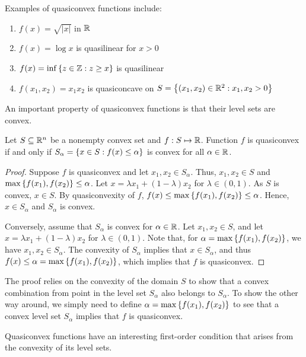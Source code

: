 Examples of quasiconvex functions include:
%
\begin{enumerate}
	\item $f(x) = \sqrt{|x|}$ in $\mathbb{R}$
	\item $f(x) = \log x$ is quasilinear for $x > 0 $ 
	\item $f(x) = \inf\left\{ z \in \mathbb{Z} : z \geq x \right \}$ is quasilinear
	\item $f(x_1,x_2) = x_1x_2$ is quasiconcave on $S = \left\{ (x_1, x_2) \in \mathbb{R}^2 : x_1,x_2 > 0 \right \}$
\end{enumerate}
%
An important property of quasiconvex functions is that their level sets are convex. 
%
\begin{theorem}
	Let $S \subseteq \mathbb{R}^n$ be a nonempty convex set and $f:S \mapsto \mathbb{R}$. Function $f$ is quasiconvex if and only if $S_\alpha = \left\{ x \in S: f(x) \leq \alpha \right \}$ is convex for all $\alpha \in \mathbb{R}$.
\end{theorem}
%
\begin{proof}
	Suppose $f$ is quasiconvex and let $x_1, x_2 \in S_\alpha$. Thus, $x_1, x_2 \in S$ and $\max\left\{ f(x_1), f(x_2) \right \} \leq \alpha$. Let $x = \lambda x_1 + (1-\lambda)x_2$ for $\lambda \in (0,1)$. As $S$ is convex, $x \in S$. By quasiconvexity of $f$, $f(x) \leq \max\left\{ f(x_1), f(x_2) \right \} \leq \alpha$. Hence, $x \in S_\alpha$ and $S_\alpha$ is convex.  

	Conversely, assume that $S_\alpha$ is convex for $\alpha \in \mathbb{R}$. Let $x_1, x_2 \in S$, and let $x = \lambda x_1 + (1-\lambda)x_2$ for $\lambda \in (0,1)$. Note that, for $\alpha = \max\left\{ f(x_1), f(x_2) \right \}$, we have $x_1, x_2 \in S_\alpha$. The convexity of $S_\alpha$ implies that $x \in S_\alpha$, and thus $f(x) \leq \alpha = \max\left\{ f(x_1), f(x_2) \right \}$, which implies that $f$ is quasiconvex.
\end{proof}
 
The proof relies on the convexity of the domain $S$ to show that a convex combination from point in the level set $S_\alpha$ also belongs to $S_\alpha$. To show the other way around, we simply need to define $\alpha = \max\left\{ f(x_1), f(x_2) \right \}$ to see that a convex level set $S_\alpha$ implies that $f$ is quasiconvex. 

Quasiconvex functions have an interesting first-order condition that arises from the convexity of its level sets.

